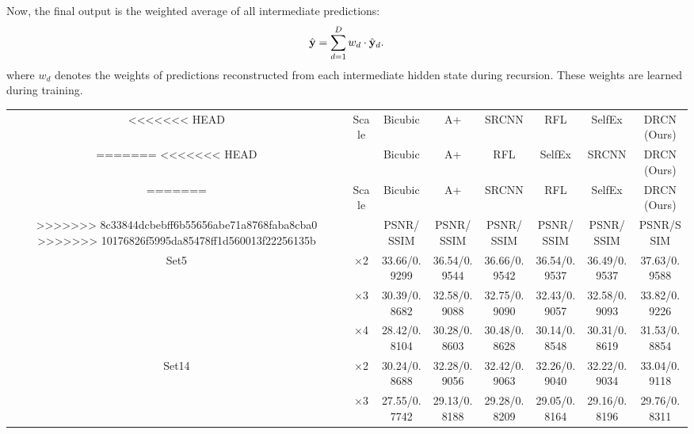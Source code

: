\documentclass[10pt,twocolumn,letterpaper]{article}
\begin{document}
Now, the final output is the weighted average of all intermediate predictions:
\begin{equation}
\hat{{\bf y}} = \sum_{d=1}^{D} w_d \cdot \hat{{\bf y}}_d.
\end{equation}
where $w_d$ denotes the weights of predictions reconstructed from each intermediate hidden state during recursion. These weights are learned during training.


\begin{table}
\begin{center}
\setlength{\tabcolsep}{2pt}
\small
\begin{tabular}{ | c | c | c | c | c | c | c | c | }
\hline
<<<<<<< HEAD
\multirow{2}{*}{Dataset} & \multirow{2}{*}{Scale} & Bicubic & A+ \cite{Timofte} & SRCNN \cite{dong2014image} & RFL \cite{schulter2015fast} & SelfEx \cite{Huang-CVPR-2015} & DRCN (Ours)\\
=======
<<<<<<< HEAD
\multirow{2}{*}{Dataset} & \multirow{2}{*}{Scale} & Bicubic & A+ & RFL & SelfEx & SRCNN & DRCN (Ours)\\
=======
\multirow{2}{*}{Dataset} & \multirow{2}{*}{Scale} & Bicubic & A+\cite{Timofte} & SRCNN\cite{dong2014image} & RFL\cite{schulter2015fast} & SelfEx\cite{Huang-CVPR-2015} & DRCN (Ours)\\
>>>>>>> 8c33844dcbebff6b55656abe71a8768faba8cba0
>>>>>>> 10176826f5995da85478ff1d560013f22256135b
 & & PSNR/SSIM & PSNR/SSIM & PSNR/SSIM & PSNR/SSIM & PSNR/SSIM & PSNR/SSIM\\
\hline
\hline
\multirow{3}{*}{Set5} & $\times$2 & 33.66/0.9299 & 36.54/{\color{blue}0.9544} & {\color{blue}36.66}/0.9542 & 36.54/0.9537 & 36.49/0.9537 & {\color{red}37.63}/{\color{red}0.9588}\\
 & $\times$3 & 30.39/0.8682 & 32.58/0.9088 & {\color{blue}32.75}/0.9090 & 32.43/0.9057 & 32.58/{\color{blue}0.9093} & {\color{red}33.82}/{\color{red}0.9226}\\
 & $\times$4 & 28.42/0.8104 & 30.28/0.8603 & {\color{blue}30.48}/{\color{blue}0.8628} & 30.14/0.8548 & 30.31/0.8619 & {\color{red}31.53}/{\color{red}0.8854}\\
\hline
\hline
\multirow{3}{*}{Set14} & $\times$2 & 30.24/0.8688 & 32.28/0.9056 & {\color{blue}32.42}/{\color{blue}0.9063} & 32.26/0.9040 & 32.22/0.9034 & {\color{red}33.04}/{\color{red}0.9118}\\
 & $\times$3 & 27.55/0.7742 & 29.13/0.8188 & {\color{blue}29.28}/{\color{blue}0.8209} & 29.05/0.8164 & 29.16/0.8196 & {\color{red}29.76}/{\color{red}0.8311}\\

\end{tabular}
\end{center}
\end{table}
\end{document}
